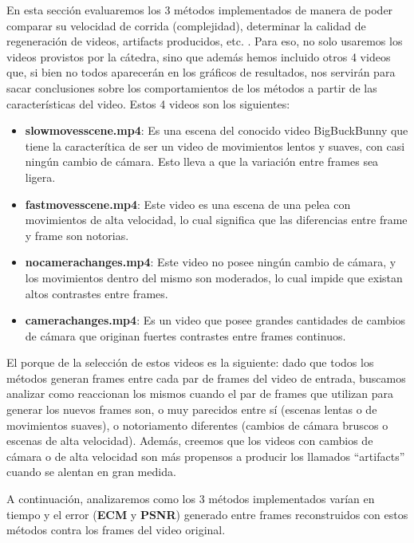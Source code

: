 En esta secci\'on evaluaremos los 3 m\'etodos implementados de manera de poder comparar su velocidad de corrida (complejidad), determinar la calidad de regeneraci\'on de videos, artifacts producidos, etc. . Para eso, no solo usaremos los videos provistos por la c\'atedra, sino que adem\'as hemos incluido otros 4 videos que, si bien no todos aparecer\'an en los gr\'aficos de resultados, nos servir\'an para sacar conclusiones sobre los comportamientos de los m\'etodos a partir de las caracter\'isticas del video. Estos 4 videos son los siguientes:

\begin{itemize}
\item \textbf{slowmovesscene.mp4}: Es una escena del conocido video BigBuckBunny que tiene la caracter\'itica de ser un video de movimientos lentos y suaves, con casi ning\'un cambio de c\'amara. Esto lleva a que la variaci\'on entre frames sea ligera. 
\item \textbf{fastmovesscene.mp4}: Este video es una escena de una pelea con movimientos de alta velocidad, lo cual significa que las diferencias entre frame y frame son notorias.
\item \textbf{nocamerachanges.mp4}: Este video no posee ning\'un cambio de c\'amara, y los movimientos dentro del mismo son moderados, lo cual impide que existan altos contrastes entre frames.
\item \textbf{camerachanges.mp4}: Es un video que posee grandes cantidades de cambios de c\'amara que originan fuertes contrastes entre frames continuos.
\end{itemize}

El porque de la selecci\'on de estos videos es la siguiente: dado que todos los m\'etodos generan frames entre cada par de frames del video de entrada, buscamos analizar como reaccionan los mismos cuando el par de frames que utilizan para generar los nuevos frames son, o muy parecidos entre s\'i (escenas lentas o de movimientos suaves), o notoriamento diferentes (cambios de c\'amara bruscos o escenas de alta velocidad). Adem\'as, creemos que los videos con cambios de c\'amara o de alta velocidad son m\'as propensos a producir los llamados ``artifacts'' cuando se alentan en gran medida. 

A continuaci\'on, analizaremos como los 3 m\'etodos implementados var\'ian en tiempo y el error (\textbf{ECM} y \textbf{PSNR}) generado entre frames reconstruidos con estos m\'etodos contra los frames del video original.